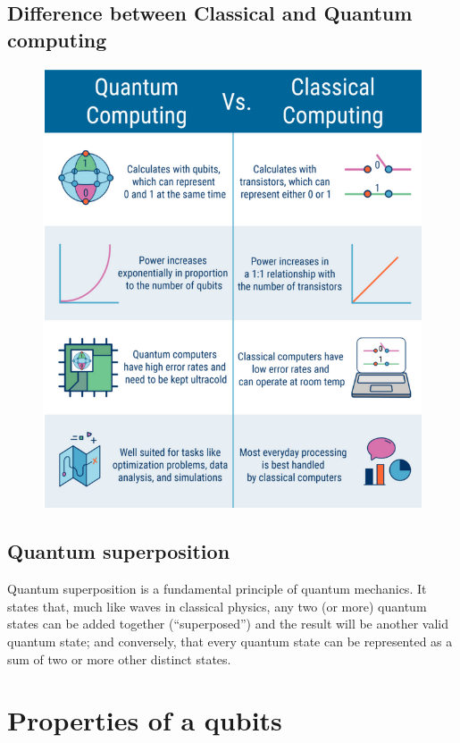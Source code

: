\documentclass{article}
\begin{document}
\subsection{Difference between  Classical and Quantum computing}
\label{subsec: Difference between  Classical and Quantum computing}
\begin{figure}[h]
    \centering
    \includegraphics[scale = 0.5]{cc_qc.png}
\end{figure}

\subsection{Quantum superposition}
\label{subsec:Quantum superposition}
Quantum superposition is a fundamental principle of quantum mechanics. It states that, much like waves in classical physics, any two (or more) quantum states can be added together (“superposed”) and the result will be another valid quantum state; and conversely, that every quantum state can be represented as a sum of two or more other distinct states.

\section{Properties of a qubits}
\label{Properties of a qubits}
\end{document}
